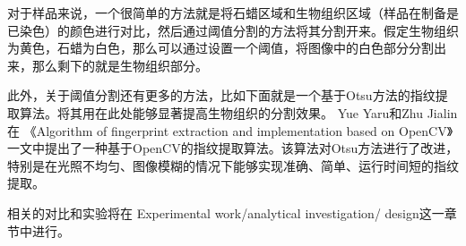 对于样品来说，一个很简单的方法就是将石蜡区域和生物组织区域（样品在制备是已染色）的颜色进行对比，然后通过阈值分割的方法将其分割开来。假定生物组织为黄色，石蜡为白色，那么可以通过设置一个阈值，将图像中的白色部分分割出来，那么剩下的就是生物组织部分。

此外，关于阈值分割还有更多的方法，比如下面就是一个基于Otsu方法的指纹提取算法。将其用在此处能够显著提高生物组织的分割效果。
Yue Yaru和Zhu Jialin 在 《Algorithm of fingerprint extraction and implementation based on OpenCV》一文中提出了一种基于OpenCV的指纹提取算法。该算法对Otsu方法进行了改进，特别是在光照不均匀、图像模糊的情况下能够实现准确、简单、运行时间短的指纹提取。\cite{3.3}

相关的对比和实验将在 Experimental work/analytical investigation/ design这一章节中进行。


\FloatBarrier






